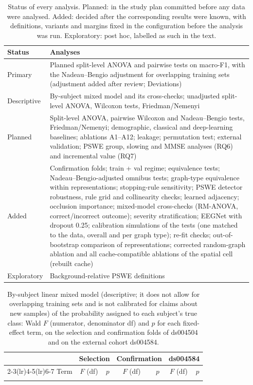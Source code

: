 \begin{table}[h]
\centering\scriptsize
\caption{Status of every analysis. Planned: in the study plan committed before any data were analysed.
Added: decided after the corresponding results were known, with definitions, variants and margins fixed in
the configuration before the analysis was run. Exploratory: post hoc, labelled as such in the text.}
\label{tab:status}
\begin{tabular}{p{4.2cm}p{9.6cm}}
\toprule
Status & Analyses \\
\midrule
Primary & Planned split-level ANOVA and pairwise tests on macro-F1, with the Nadeau--Bengio adjustment for overlapping training sets (adjustment added after review; Deviations) \\
Descriptive & By-subject mixed model and its cross-checks; unadjusted split-level ANOVA, Wilcoxon tests, Friedman/Nemenyi \\
Planned & Split-level ANOVA, pairwise Wilcoxon and Nadeau--Bengio tests, Friedman/Nemenyi; demographic, classical and deep-learning baselines; ablations A1--A12; leakage; permutation test; external validation; PSWE group, slowing and MMSE analyses (RQ6) and incremental value (RQ7) \\
Added & Confirmation folds; train + val regime; equivalence tests; Nadeau--Bengio-adjusted omnibus tests; graph-type equivalence within representations; stopping-rule sensitivity; PSWE detector robustness, rule grid and collinearity checks; learned adjacency; occlusion importance; mixed-model cross-checks (RM-ANOVA, correct/incorrect outcome); severity stratification; EEGNet with dropout 0.25; calibration simulations of the tests (one matched to the data, overall and per graph type); re-fit checks; out-of-bootstrap comparison of representations; corrected random-graph ablation and all cache-compatible ablations of the spatial cell (rebuilt cache) \\
Exploratory & Background-relative PSWE definitions \\
\bottomrule
\end{tabular}
\end{table}

\begin{table}[h]
\centering\small
\caption{By-subject linear mixed model (descriptive; it does not allow for overlapping training sets and
is not calibrated for claims about new samples) of the probability assigned to each
subject's true class: Wald $F$ (numerator, denominator df) and $p$ for each fixed-effect term, on the
selection and confirmation folds of ds004504 and on the external cohort ds004584.}
\label{tab:mixed}
\setlength{\tabcolsep}{3.5pt}
\begin{tabular}{lcccccc}
\toprule
 & \multicolumn{2}{c}{Selection} & \multicolumn{2}{c}{Confirmation} & \multicolumn{2}{c}{ds004584} \\
\cmidrule(lr){2-3}\cmidrule(lr){4-5}\cmidrule(lr){6-7}
Term & $F$ (df) & $p$ & $F$ (df) & $p$ & $F$ (df) & $p$ \\
\midrule
{}{generated/tab/mixed.tex}
\bottomrule
\end{tabular}
\end{table}


